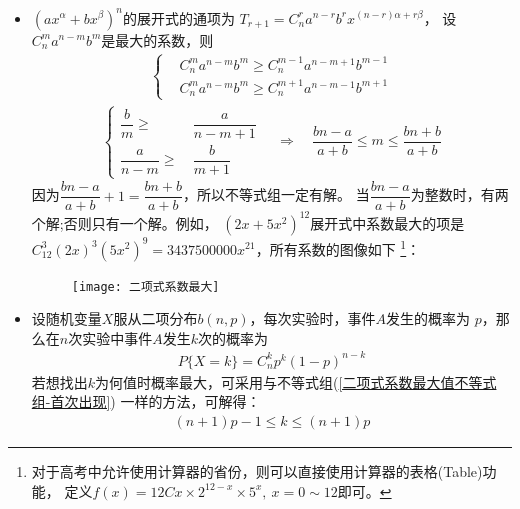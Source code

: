 \begin{itemize}[leftmargin=\inteval{\myitemleftmargin}pt,itemsep=
   \inteval{\myitemitempsep}pt,topsep=\inteval{\myitemtopsep}pt]
上面介绍的上台阶、汉诺塔和错排三个问题，如果试图直接寻找答案，无疑是相当困难的，而寻找递推关系则要简单得多。
\item $ \left(ax^{\alpha}+bx^{\beta} \right)^n $的展开式的通项为
$ T_{r+1}=C_n^ra^{n-r}b^rx^{(n-r)\alpha+r\beta} $，
设$ C_n^m a^{n-m}b^m $是最大的系数，则
\begin{align}\label{二项式系数最大值不等式组-首次出现}
    \left\{
    \begin{aligned}
        & C_n^m a^{n-m}b^m\geq C_n^{m-1} a^{n-m+1}b^{m-1} \\
        & C_n^m a^{n-m}b^m\geq C_n^{m+1} a^{n-m-1}b^{m+1}
    \end{aligned}
    \right.
\end{align} 
\begin{align*}
    \left\{
    \begin{aligned}
        \dfrac{b}{m}   \geq &\ \dfrac{a}{n-m+1} \\
        \dfrac{a}{n-m} \geq &\ \dfrac{b}{m+1}
    \end{aligned}
    \right. \quad \Rightarrow \quad 
    \dfrac{bn-a}{a+b} \leq m \leq \dfrac{bn+b}{a+b}
\end{align*} 
因为$ \dfrac{bn-a}{a+b}+1=\dfrac{bn+b}{a+b} $，所以不等式组一定有解。
当$ \dfrac{bn-a}{a+b} $为整数时，有两个解;否则只有一个解。例如，
$ (2x+5x^2)^{12} $展开式中系数最大的项是
$ C_{12}^{3}(2x)^3(5x^2)^9=3437500000x^{21} $，所有系数的图像如下
\footnote{对于高考中允许使用计算器的省份，则可以直接使用计算器的表格(Table)功能，
    定义$ f(x)= 12Cx\times 2^{12-x}\times 5^x,\ x=0\sim 12 $即可。}：
\begin{figure}[h]
    \centering
    \texttt{[image: 二项式系数最大]}
\end{figure} 

\item 设随机变量$ X $服从二项分布$ b(n,p) $，每次实验时，事件$ A $发生的概率为
$ p $，那么在$ n $次实验中事件$ A $发生$ k $次的概率为
\begin{align*}
    P\{X=k\}=C_n^kp^k(1-p)^{n-k}
\end{align*}
若想找出$ k $为何值时概率最大，可采用与不等式组(\ref{二项式系数最大值不等式组-首次出现})
一样的方法，可解得：
\begin{align*}
    (n+1)p-1\leq k \leq (n+1)p 
\end{align*}



\end{itemize}
